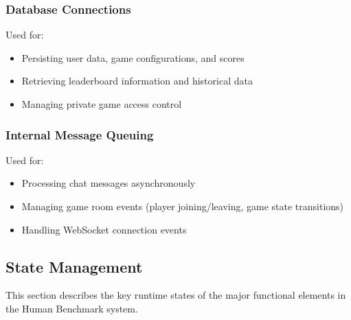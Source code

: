\subsubsection{Database Connections}

Used for:
\begin{itemize}
    \item Persisting user data, game configurations, and scores
    \item Retrieving leaderboard information and historical data
    \item Managing private game access control
\end{itemize}

\subsubsection{Internal Message Queuing}

Used for:
\begin{itemize}
    \item Processing chat messages asynchronously
    \item Managing game room events (player joining/leaving, game state transitions)
    \item Handling WebSocket connection events
\end{itemize}


\subsection{State Management}

This section describes the key runtime states of the major functional elements in the Human Benchmark system.

